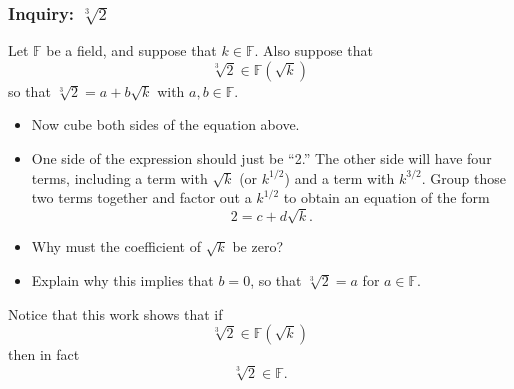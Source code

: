 \documentclass[11pt]{article}
\newenvironment{task}
	{\begin{mdframed}[linecolor=lightgray, linewidth=3pt]\raggedright}
	{\end{mdframed}}
\theoremstyle{definition}
\begin{document}
\subsubsection{Inquiry: $\sqrt[3]{2}$}
\begin{task}
  Let $\mathbb{F}$ be a field, and suppose that $k\in\mathbb{F}$. Also suppose that
  \[ \sqrt[3]{2} \in \mathbb{F}(\sqrt{k})\]
  so that $\sqrt[3]{2} = a + b\sqrt{k}$ with $a,b \in \mathbb{F}$.
  \begin{itemize}
    \item Now cube both sides of the equation above.
    \item One side of the expression should just be ``2.'' The other side will have four terms, including a term with $\sqrt{k}$ (or $k^{1/2}$) and
      a term with $k^{3/2}$. Group those two terms together and factor out a $k^{1/2}$ to obtain an equation of the form
      \[ 2 = c + d\sqrt{k}.\]
    \item Why must the coefficient of $\sqrt{k}$ be zero?
    \item Explain why this implies that $b=0$, so that $\sqrt[3]{2} = a$ for $a\in \mathbb{F}$.
  \end{itemize}
  Notice that this work shows that if
  \[ \sqrt[3]{2} \in \mathbb{F}(\sqrt{k})\]
  then in fact
  \[ \sqrt[3]{2} \in \mathbb{F}.\]
\end{task}\newpage
\end{document}

